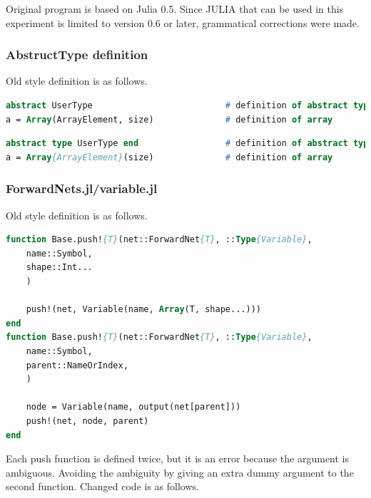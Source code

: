 Original program is based on Julia 0.5. 
Since JULIA that can be used in this experiment is limited to version 0.6 or later, grammatical corrections were made.

\subsubsection{AbstructType definition}

Old style definition is as follows.

\begin{lstlisting}[caption=Julia old style definition ,label=list:julia_05_def, escapechar=!, language=Pascal, frame=single]
abstract UserType                          # definition of abstract type
a = Array(ArrayElement, size)              # definition of array
\end{lstlisting}



\begin{lstlisting}[caption=Julia 0.6 style ,label=list:julia_06_def, escapechar=!, language=Pascal, frame=single]
abstract type UserType end                 # definition of abstract type
a = Array{ArrayElement}(size)              # definition of array
\end{lstlisting}


\subsubsection{ForwardNets.jl/variable.jl}

Old style definition is as follows.

\begin{lstlisting}[caption=Julia old style definition 
,label=list:julia_05_forwardnets, language=Pascal, frame=single]
function Base.push!{T}(net::ForwardNet{T}, ::Type{Variable},
    name::Symbol,
    shape::Int...
    )

    push!(net, Variable(name, Array(T, shape...)))
end
function Base.push!{T}(net::ForwardNet{T}, ::Type{Variable},
    name::Symbol,
    parent::NameOrIndex,
    )

    node = Variable(name, output(net[parent]))
    push!(net, node, parent)
end
\end{lstlisting}

Each push function is defined twice, but it is an error because the argument is ambiguous. Avoiding the ambiguity by giving an extra dummy argument to the second function.
Changed code is as follows.

